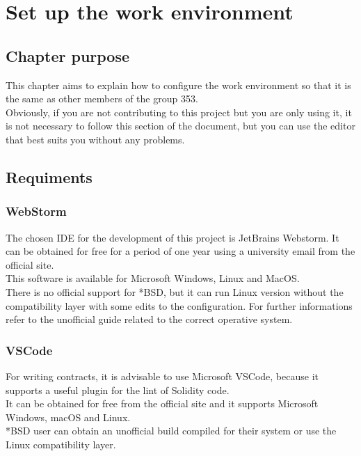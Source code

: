 \documentclass[ManualeSviluppatore]{subfiles}
\begin{document}
\chapter{Set up the work environment}
\section{Chapter purpose}
This chapter aims to explain how to configure the work environment so that it is the same as other members of the group 353. \\
Obviously, if you are not contributing to this project but you are only using it, it is not necessary to follow this section of the document, but you can use the editor that best suits you without any problems.

\section{Requiments}
\subsection{WebStorm}
The chosen IDE for the development of this project is JetBrains Webstorm. It can be obtained for free for a period of one year using a university email from the official site. \\
This software is available for Microsoft Windows, Linux and MacOS. \\
There is no official support for *BSD, but it can run Linux version without the compatibility layer with some edits to the configuration. For further informations refer to the unofficial guide related to the correct operative system.

\subsection{VSCode}
For writing contracts, it is advisable to use Microsoft VSCode, because it supports a useful plugin for the lint of Solidity code. \\
It can be obtained for free from the official site and it supports Microsoft Windows, macOS and Linux. \\
*BSD user can obtain an unofficial build compiled for their system or use the Linux compatibility layer. \\
\end{document}

